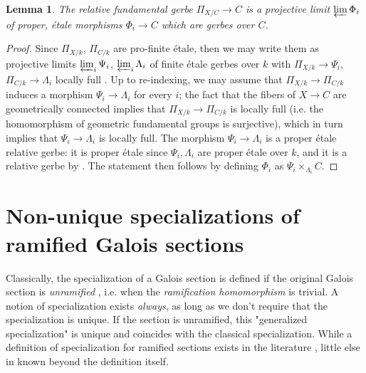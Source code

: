 \documentclass[11pt]{amsart}
\theoremstyle{plain}
\newtheorem{lemma}[theorem]{Lemma}
\theoremstyle{definition}
\newcommand{\1}{\mathbb{1}}
\renewcommand{\projlim}{\varprojlim}
\begin{document}
\begin{lemma}\label{limit}
	The relative fundamental gerbe $\Pi_{X/C}\to C$ is a projective limit $\projlim \Phi_{i}$ of proper, étale morphisms $\Phi_{i}\to C$ which are gerbes over $C$.
\end{lemma}

\begin{proof}
	Since $\Pi_{X/k}$, $\Pi_{C/k}$ are pro-finite étale, then we may write them as projective limits $\projlim_{i}\Psi_{i}$, $\projlim_{i}\Lambda_{i}$ of finite étale gerbes over $k$ with $\Pi_{X/k}\to\Psi_{i}$, $\Pi_{C/k}\to\Lambda_{i}$ locally full \cite[Definition 3.4, Proposition 3.9]{bv19}. Up to re-indexing, we may assume that $\Pi_{X/k}\to\Pi_{C/k}$ induces a morphism $\Psi_{i}\to\Lambda_{i}$ for every $i$; the fact that the fibers of $X\to C$ are geometrically connected implies that $\Pi_{X/k}\to\Pi_{C/k}$ is locally full (i.e. the homomorphism of geometric fundamental groups is surjective), which in turn implies that $\Psi_{i}\to\Lambda_{i}$ is locally full. The morphism $\Psi_{i}\to\Lambda_{i}$ is a proper étale relative gerbe: it is proper étale since $\Psi_{i},\Lambda_{i}$ are proper étale over $k$, and it is a relative gerbe by \cite[Proposition 3.10]{bv19}. The statement then follows by defining $\Phi_{i}$ as $\Psi_{i}\times_{\Lambda_{i}}C$.
\end{proof}



\section{Non-unique specializations of ramified Galois sections}\label{ramspe}

Classically, the specialization of a Galois section is defined if the original Galois section is \emph{unramified} \cite[\S 8.2]{sti13}, i.e. when the \emph{ramification homomorphism} is trivial. A notion of specialization exists \emph{always}, as long as we don't require that the specialization is unique. If the section is unramified, this "generalized specialization" is unique and coincides with the classical specialization. While a definition of specialization for ramified sections exists in the literature \cite[Corollary 8.9]{sti13}, little else in known beyond the definition itself. 



\end{document}
